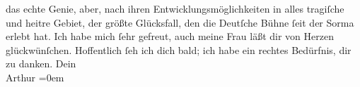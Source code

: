 \begin{ledgroupsized}[t]{13cm}
               das echte Genie, aber, nach ihren Entwicklungsmöglichkeiten in alles tragiſche und
               heitre Gebiet, der größte Glücksfall, den die Deutſche Bühne ſeit der Sorma erlebt hat.\pend
           \pstart
           Ich habe mich ſehr gefreut, auch meine Frau läßt dir von Herzen glückwünſchen.\pend
           \pstart
           Hoffentlich ſeh ich dich bald; ich habe ein rechtes Bedürfnis, dir zu danken.\pend
           \pstart
           Dein{\\[\baselineskip]}\spacefill\mbox{Arthur}\pend
           \leftskip=0em{}
         
         \endnumbering{}\end{ledgroupsized}  \newcommand{\dateiname}{L01523}\newcommand{\titel}{Arthur Schnitzler an Hermann Bahr, 6. 6. 1905}\newcommand{\editorInnen}{ Kurt Ifkovits,  Martin Anton Müller}
      